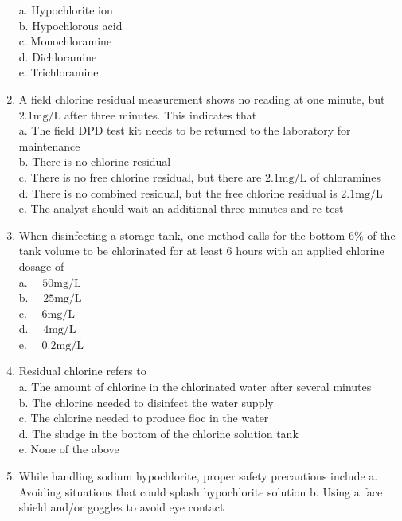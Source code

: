 \begin{enumerate}
a. Hypochlorite ion\\
b. Hypochlorous acid\\
c. Monochloramine\\
d. Dichloramine\\
e. Trichloramine\\
  \item A field chlorine residual measurement shows no reading at one minute, but $2.1 \mathrm{mg} / \mathrm{L}$ after three minutes. This indicates that\\
a. The field DPD test kit needs to be returned to the laboratory for maintenance\\
b. There is no chlorine residual\\
c. There is no free chlorine residual, but there are $2.1 \mathrm{mg} / \mathrm{L}$ of chloramines\\
d. There is no combined residual, but the free chlorine residual is $2.1 \mathrm{mg} / \mathrm{L}$\\
e. The analyst should wait an additional three minutes and re-test\\
  \item When disinfecting a storage tank, one method calls for the bottom $6 \%$ of the tank volume to be chlorinated for at least 6 hours with an applied chlorine dosage of\\
a. $\quad 50 \mathrm{mg} / \mathrm{L}$\\
b. $\quad 25 \mathrm{mg} / \mathrm{L}$\\
c. $\quad 6 \mathrm{mg} / \mathrm{L}$\\
d. $\quad 4 \mathrm{mg} / \mathrm{L}$\\
e. $\quad 0.2 \mathrm{mg} / \mathrm{L}$ \\
\item Residual chlorine refers to\\
a. The amount of chlorine in the chlorinated water after several minutes\\
b. The chlorine needed to disinfect the water supply\\
c. The chlorine needed to produce floc in the water\\
d. The sludge in the bottom of the chlorine solution tank\\
e. None of the above\\
 \item While handling sodium hypochlorite, proper safety precautions include
a. Avoiding situations that could splash hypochlorite solution
b. Using a face shield and/or goggles to avoid eye contact

\end{enumerate}
